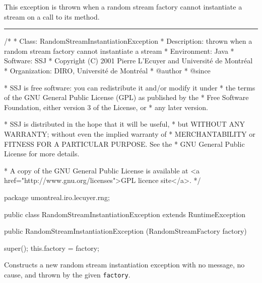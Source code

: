 
This exception is thrown when a random stream factory cannot instantiate a stream
on a call to its  method.

\bigskip\hrule

\begin{code}
\begin{hide}
/*
 * Class:        RandomStreamInstantiationException
 * Description:  thrown when a random stream factory cannot instantiate a stream
 * Environment:  Java
 * Software:     SSJ 
 * Copyright (C) 2001  Pierre L'Ecuyer and Université de Montréal
 * Organization: DIRO, Université de Montréal
 * @author       
 * @since

 * SSJ is free software: you can redistribute it and/or modify it under
 * the terms of the GNU General Public License (GPL) as published by the
 * Free Software Foundation, either version 3 of the License, or
 * any later version.

 * SSJ is distributed in the hope that it will be useful,
 * but WITHOUT ANY WARRANTY; without even the implied warranty of
 * MERCHANTABILITY or FITNESS FOR A PARTICULAR PURPOSE.  See the
 * GNU General Public License for more details.

 * A copy of the GNU General Public License is available at
   <a href="http://www.gnu.org/licenses">GPL licence site</a>.
 */
\end{hide}
package umontreal.iro.lecuyer.rng;

public class RandomStreamInstantiationException extends RuntimeException\begin{hide} {
   private RandomStreamFactory factory;
\end{hide}

   public RandomStreamInstantiationException (RandomStreamFactory factory)\begin{hide} {
      super();
      this.factory = factory;
   }\end{hide}
\end{code}
\begin{tabb}   Constructs a new random stream instantiation exception with
 no message, no cause, and thrown by the given \texttt{factory}.
\end{tabb}
\begin{htmlonly}
\end{htmlonly}
